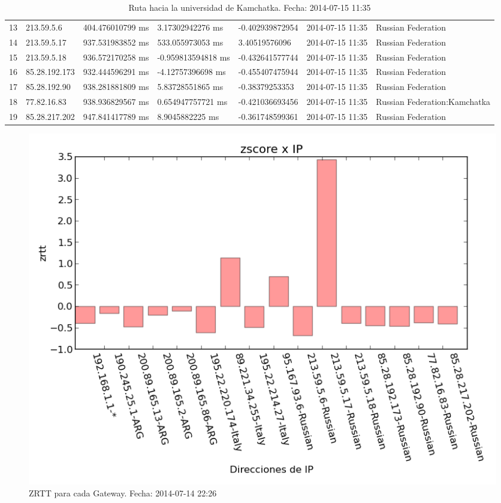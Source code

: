 \begin{table}[h]
{\begin{tabular}{lllllll}
13  & 213.59.5.6     & 404.476010799 ms & 3.17302942276 ms   & -0.402939872954 & 2014-07-15 11:35 & Russian Federation           \\
14  & 213.59.5.17    & 937.531983852 ms & 533.055973053 ms   & 3.40519576096   & 2014-07-15 11:35 & Russian Federation           \\
15  & 213.59.5.18    & 936.572170258 ms & -0.959813594818 ms & -0.432641577744 & 2014-07-15 11:35 & Russian Federation           \\
16  & 85.28.192.173  & 932.444596291 ms & -4.12757396698 ms  & -0.455407475944 & 2014-07-15 11:35 & Russian Federation           \\
17  & 85.28.192.90   & 938.281881809 ms & 5.83728551865 ms   & -0.38379253353  & 2014-07-15 11:35 & Russian Federation           \\
18  & 77.82.16.83    & 938.936829567 ms & 0.654947757721 ms  & -0.421036693456 & 2014-07-15 11:35 & Russian Federation:Kamchatka \\
19  & 85.28.217.202  & 947.841417789 ms & 8.9045882225 ms    & -0.361748599361 & 2014-07-15 11:35 & Russian Federation          
\end{tabular}
}
\caption{Ruta hacia la universidad de Kamchatka. Fecha: 2014-07-15 11:35}
\label{my-label}
\end{table}

\begin{figure}[H]
	\begin{center}
		  \includegraphics[scale=0.5]{../graficos_informe/kamgu_zscore.png}
		  \caption{ZRTT para cada Gateway. Fecha: 2014-07-14 22:26}
		  \label{fig:contra1}
	\end{center}
\end{figure}

